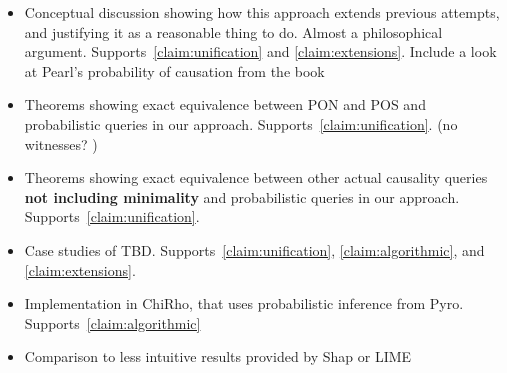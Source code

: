 \documentclass{article}
\begin{document}
\begin{itemize}

    \item Conceptual discussion showing how this approach extends previous attempts, and justifying it as a reasonable thing to do. Almost a philosophical argument. Supports~\ref{claim:unification} and \ref{claim:extensions}. Include a look at Pearl's probability of causation from the book
    
    \item Theorems showing exact equivalence between PON and POS and probabilistic queries in our approach. Supports~\ref{claim:unification}. (no witnesses? )
    
    \item Theorems showing exact equivalence between other actual causality queries \textbf{not including minimality} and probabilistic queries in our approach. Supports~\ref{claim:unification}.
    
    
    \item Case studies of TBD. Supports~\ref{claim:unification}, \ref{claim:algorithmic}, and \ref{claim:extensions}.
    
    \item Implementation in ChiRho, that uses probabilistic inference from Pyro. Supports~\ref{claim:algorithmic}

    \item Comparison to less intuitive results provided by Shap or LIME
\end{itemize}





\end{document}
